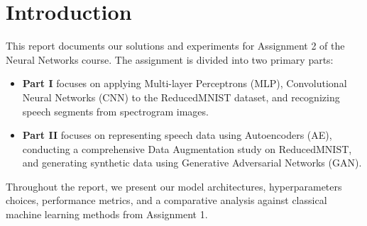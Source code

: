 \section{Introduction}

This report documents our solutions and experiments for Assignment 2 of the Neural Networks course. The assignment is divided into two primary parts:
\begin{itemize}
    \item \textbf{Part I} focuses on applying Multi-layer Perceptrons (MLP), Convolutional Neural Networks (CNN) to the ReducedMNIST dataset, and recognizing speech segments from spectrogram images.
    \item \textbf{Part II} focuses on representing speech data using Autoencoders (AE), conducting a comprehensive Data Augmentation study on ReducedMNIST, and generating synthetic data using Generative Adversarial Networks (GAN).
\end{itemize}

Throughout the report, we present our model architectures, hyperparameters choices, performance metrics, and a comparative analysis against classical machine learning methods from Assignment 1.
